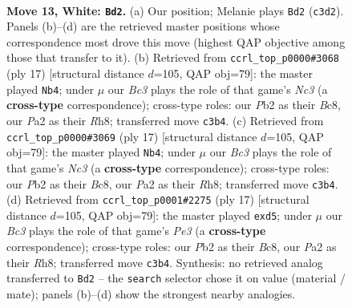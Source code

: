 \documentclass[11pt]{article}
\begin{document}
\clearpage

\begin{figure}[p]\centering
\begin{subfigure}{0.46\textwidth}\centering
\resizebox{\linewidth}{!}{%
\newchessgame
\chessboard[
  setfen={1rb1r1k1/p1p1qppp/2n1pn2/2Pp4/1p1P4/1QB1PNP1/PP3P1P/R3KB1R w Q - 0 13},
  showmover=false,
  pgfstyle=straightmove, color=movearrow, markmove={c3-d2}
]}
\caption{}
\end{subfigure}\hfill
\begin{subfigure}{0.46\textwidth}\centering
\resizebox{\linewidth}{!}{%
\newchessgame
\chessboard[
  setfen={1rbqkb1r/2p2ppp/p1n1pn2/1p1P4/2p1P3/2N2NP1/PP3PBP/R1BQ1RK1 b k - 0 9},
  showmover=false,
  pgfstyle=straightmove, color=movearrow, markmove={c6-b4}
]}
\caption{}
\end{subfigure}
\\[4pt]
\begin{subfigure}{0.46\textwidth}\centering
\resizebox{\linewidth}{!}{%
\newchessgame
\chessboard[
  setfen={1rbqkb1r/2p2ppp/p1n1pn2/1p1P4/2p1P3/2N2NP1/PP3PBP/R1BQ1RK1 b k - 0 9},
  showmover=false,
  pgfstyle=straightmove, color=movearrow, markmove={c6-b4}
]}
\caption{}
\end{subfigure}\hfill
\begin{subfigure}{0.46\textwidth}\centering
\resizebox{\linewidth}{!}{%
\newchessgame
\chessboard[
  setfen={1rbqkb1r/2p2ppp/p1n1pn2/1p1P4/2p1P3/2N2NP1/PP3PBP/R1BQ1RK1 b k - 0 9},
  showmover=false,
  pgfstyle=straightmove, color=movearrow, markmove={e6-d5}
]}
\caption{}
\end{subfigure}
\caption{\textbf{Move 13, White: \texttt{Bd2}.} (a) Our position; Melanie plays \texttt{Bd2} (\texttt{c3d2}). Panels (b)--(d) are the retrieved master positions whose correspondence most drove this move (highest QAP objective among those that transfer to it). (b) Retrieved from \texttt{ccrl\_top\_p0000\#3068} (ply 17) [structural distance $d$=105, QAP obj=79]: the master played \texttt{Nb4}; under $\mu$ our \emph{Bc3} plays the role of that game's \emph{Nc3} (a \textbf{cross-type} correspondence); cross-type roles: our \emph{P}b2 as their \emph{B}c8, our \emph{P}a2 as their \emph{R}h8; transferred move \texttt{c3b4}. (c) Retrieved from \texttt{ccrl\_top\_p0000\#3069} (ply 17) [structural distance $d$=105, QAP obj=79]: the master played \texttt{Nb4}; under $\mu$ our \emph{Bc3} plays the role of that game's \emph{Nc3} (a \textbf{cross-type} correspondence); cross-type roles: our \emph{P}b2 as their \emph{B}c8, our \emph{P}a2 as their \emph{R}h8; transferred move \texttt{c3b4}. (d) Retrieved from \texttt{ccrl\_top\_p0001\#2275} (ply 17) [structural distance $d$=105, QAP obj=79]: the master played \texttt{exd5}; under $\mu$ our \emph{Bc3} plays the role of that game's \emph{Pe3} (a \textbf{cross-type} correspondence); cross-type roles: our \emph{P}b2 as their \emph{B}c8, our \emph{P}a2 as their \emph{R}h8; transferred move \texttt{c3b4}. Synthesis: no retrieved analog transferred to \texttt{Bd2} -- the \texttt{search} selector chose it on value (material / mate); panels (b)--(d) show the strongest nearby analogies.}
\label{fig:thought-m24}
\end{figure}
\end{document}
